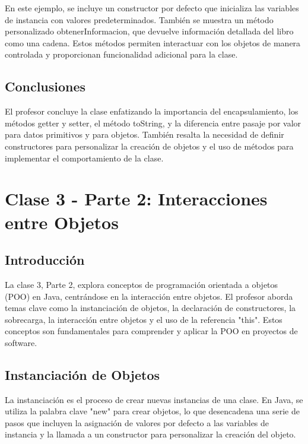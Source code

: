 \documentclass[a4paper]{report}
\begin{document}
En este ejemplo, se incluye un constructor por defecto que inicializa las variables de instancia con valores predeterminados. También se muestra un método personalizado obtenerInformacion, que devuelve información detallada del libro como una cadena. Estos métodos permiten interactuar con los objetos de manera controlada y proporcionan funcionalidad adicional para la clase.

\section{Conclusiones}
El profesor concluye la clase enfatizando la importancia del encapsulamiento, los métodos getter y setter, el método toString, y la diferencia entre pasaje por valor para datos primitivos y para objetos. También resalta la necesidad de definir constructores para personalizar la creación de objetos y el uso de métodos para implementar el comportamiento de la clase.

\newpage
\maketitle

\chapter{Clase 3 - Parte 2: Interacciones entre Objetos}
\section{Introducción}
La clase 3, Parte 2, explora conceptos de programación orientada a objetos (POO) en Java, centrándose en la interacción entre objetos. El profesor aborda temas clave como la instanciación de objetos, la declaración de constructores, la sobrecarga, la interacción entre objetos y el uso de la referencia "this". Estos conceptos son fundamentales para comprender y aplicar la POO en proyectos de software.

\section{Instanciación de Objetos}
La instanciación es el proceso de crear nuevas instancias de una clase. En Java, se utiliza la palabra clave "new" para crear objetos, lo que desencadena una serie de pasos que incluyen la asignación de valores por defecto a las variables de instancia y la llamada a un constructor para personalizar la creación del objeto.
\end{document}

